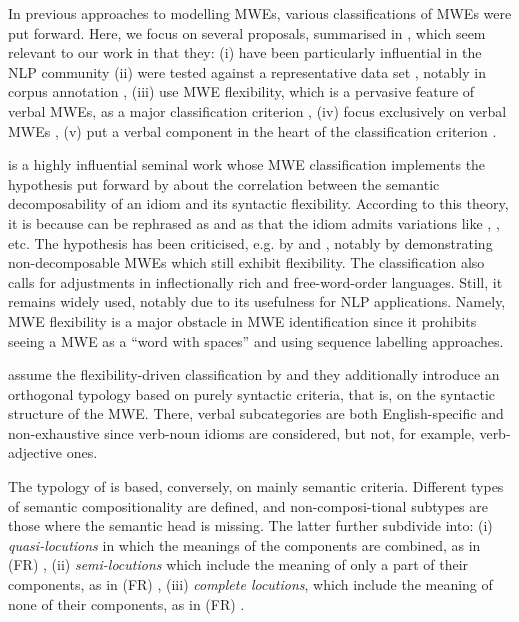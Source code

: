 \documentclass[output=paper,
modfonts,
]{langscibook}
\begin{document}
In previous approaches to modelling MWEs, various classifications of MWEs were put forward. 
Here, we focus on several proposals, summarised in , which seem relevant to our work in that they: 
(i) have been particularly influential in the NLP community \citep{Sag2002a,baldwin2010multiword,Melcuk10}
(ii) were tested against a representative data set \citep{Melcuk10}, notably in corpus annotation \citep{schneider2014}, %
(iii) use MWE flexibility, which is a pervasive feature of verbal MWEs, as a major classification criterion \citep{Sag2002a}, 
(iv) focus exclusively on verbal MWEs \citep{Sheinful17}, 
(v) put a verbal component in the heart of the classification criterion \citep{Laporte:forth}.


\citet{Sag2002a} is a highly influential seminal work whose MWE classification implements the hypothesis put forward by \citet{nunberg-94} about the correlation between the semantic decomposability of an idiom and its syntactic flexibility. According to this theory, it is because  can be rephrased as  and  as  that the idiom  admits variations like , , etc. The hypothesis has been criticised, e.g. by \citet{Sheinful17} and \citet{Laporte:forth}, notably by demonstrating non-decomposable MWEs which still exhibit flexibility. The \citet{Sag2002a} classification also calls for adjustments in inflectionally rich and free-word-order languages. Still, it remains widely used, notably due to its usefulness for NLP applications. Namely, MWE flexibility is a major obstacle in MWE identification since it prohibits seeing a MWE as a ``word with spaces'' and using sequence labelling approaches.

\citet{baldwin2010multiword} assume the flexibility-driven classification by \citet{Sag2002a} and they additionally introduce an orthogonal typology based on purely syntactic criteria, that is, on the syntactic structure of the MWE. There, verbal subcategories are both English-specific and non-exhaustive since verb-noun idioms are considered, but not, for example, verb-adjective ones.

The typology of \citet{Melcuk10} is based, conversely, on mainly semantic criteria. Different types of semantic compositionality are defined, and non-composi-tional subtypes are those where the semantic head is missing. The latter further subdivide into: (i) \emph{quasi-locutions} in which the meanings of the components are combined, as in (FR) , (ii) \emph{semi-locutions} which include the meaning of only a part of their components, as in (FR) , (iii) \emph{complete locutions}, which include the meaning of none of their components, as in (FR) .
\end{document}
